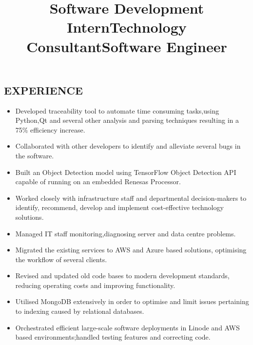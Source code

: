 \documentclass[margin]{res}
\begin{document}
\begin{resume}
\section{EXPERIENCE}
\title{\textbf{Software Development Intern}}
\begin{position}
\baselineskip=0pt
\begin{itemize}
\item Developed traceability tool to automate time consuming tasks,using Python,Qt and several other analysis and parsing techniques resulting in a 75\% efficiency increase.
\item Collaborated with other developers to identify and alleviate several bugs in the software.
\item Built an Object Detection model using TensorFlow Object Detection API capable of running on an embedded Renesas Processor.
\end{itemize}
\end{position}
\title{\textbf{Technology Consultant}}
\begin{position}
\baselineskip=0pt
\begin{itemize}
\item Worked closely with infrastructure staff and departmental decision-makers to identify, recommend, develop  and implement cost-effective technology solutions.
\item Managed IT staff monitoring,diagnosing server and data centre problems.
\item Migrated the existing services to AWS and Azure based solutions, optimising the workflow of several clients.
\end{itemize}
\end{position}
\title{\textbf{Software Engineer}}
\begin{position}
\baselineskip=0pt
\begin{itemize}
\item Revised and updated old code bases to modern development standards, reducing operating costs and improving functionality.
\item Utilised MongoDB extensively in order to optimise and limit issues pertaining to indexing caused by relational databases.
\item Orchestrated efficient large-scale software deployments in Linode and AWS based environments;handled testing features and correcting code.

\end{itemize}
\end{position}
\end{resume}
\end{document}

